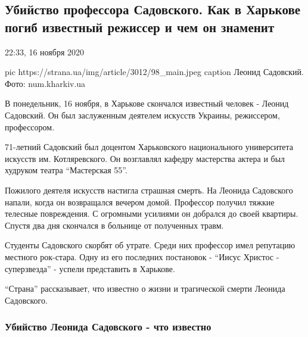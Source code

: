  
 
 
 
\subsection{Убийство профессора Садовского. Как в Харькове погиб известный режиссер и чем он знаменит}
\label{sec:16_11_2020.news.ua.strana.4.sadovskii_death}

22:33, 16 ноября 2020

\ifcmt
pic https://strana.ua/img/article/3012/98_main.jpeg
caption Леонид Садовский. Фото: num.kharkiv.ua
\fi

В понедельник, 16 ноября, в Харькове скончался известный человек - Леонид
Садовский.
Он был заслуженным деятелем искусств Украины, режиссером, профессором.

71-летний Садовский был доцентом Харьковского национального университета
искусств им. Котляревского. Он возглавлял кафедру мастерства актера и был
худруком театра \enquote{Мастерская 55}.

Пожилого деятеля искусств настигла страшная смерть. На Леонида Садовского
напали, когда он возвращался вечером домой. Профессор получил тяжкие
телесные повреждения. С огромными усилиями он добрался до своей квартиры.
Спустя два дня скончался в больнице от полученных травм. 

Студенты Садовского скорбят об утрате. Среди них профессор имел репутацию
местного рок-стара. Одну из его последних постановок - \enquote{Иисус Христос -
суперзвезда} - успели представить в Харькове. 

\enquote{Страна} рассказывает, что известно о жизни и трагической смерти Леонида
Садовского. 

\subsubsection{Убийство Леонида Садовского - что известно }

